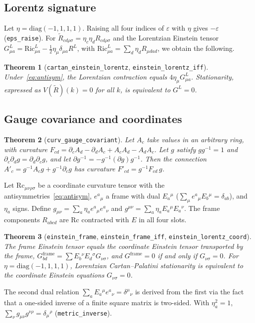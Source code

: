 \documentclass[11pt]{amsart}
\newtheorem{theorem}{Theorem}[section]
\theoremstyle{definition}
\theoremstyle{remark}
\newcommand{\lean}[1]{\texttt{#1}}
\begin{document}
\subsection{Lorentz signature}
Let $\eta=\mathrm{diag}(-1,1,1,1)$. Raising all four indices of $\varepsilon$ with $\eta$ gives $-\varepsilon$ (\lean{eps\_raise}). For $\tilde R_{cd\rho\sigma}=\eta_c\eta_dR_{cd\rho\sigma}$ and the Lorentzian Einstein tensor $G^{L}_{\mu a}=\mathrm{Ric}^L_{\mu a}-\frac12\eta_\mu\delta_{\mu a}R^L$, with $\mathrm{Ric}^L_{\mu a}=\sum_d\eta_dR_{\mu dad}$, we obtain the following.
\begin{theorem}[\lean{cartan\_einstein\_lorentz}, \lean{einstein\_lorentz\_iff}]
Under~\eqref{eq:antisym}, the Lorentzian contraction equals $4\eta_\mu G^L_{\mu a}$. Stationarity, expressed as $V(\tilde R)(k)=0$ for all $k$, is equivalent to $G^L=0$.
\end{theorem}

\subsection{Gauge covariance and coordinates}
\begin{theorem}[\lean{curv\_gauge\_covariant}]
Let $A_c$ take values in an arbitrary ring, with curvature $F_{cd}=\partial_cA_d-\partial_dA_c+A_cA_d-A_dA_c$. Let $g$ satisfy $gg^{-1}=1$ and $\partial_c\partial_dg=\partial_d\partial_cg$, and let $\partial g^{-1}=-g^{-1}(\partial g)g^{-1}$. Then the connection $A'_c=g^{-1}A_cg+g^{-1}\partial_cg$ has curvature $F'_{cd}=g^{-1}F_{cd}\,g$.
\end{theorem}

Let $\mathrm{Rc}_{\mu\nu\rho\sigma}$ be a coordinate curvature tensor with the antisymmetries~\eqref{eq:antisym}, $e^a{}_\mu$ a frame with dual $E_a{}^\mu$ ($\sum_\mu e^a{}_\mu E_b{}^\mu=\delta_{ab}$), and $\eta_a$ signs. Define $g_{\mu\nu}=\sum_a\eta_ae^a{}_\mu e^a{}_\nu$ and $g^{\mu\nu}=\sum_a\eta_aE_a{}^\mu E_a{}^\nu$. The frame components $R_{abcd}$ are $\mathrm{Rc}$ contracted with $E$ in all four slots.
\begin{theorem}[\lean{einstein\_frame}, \lean{einstein\_frame\_iff}, \lean{einstein\_lorentz\_coord}]
The frame Einstein tensor equals the coordinate Einstein tensor transported by the frame, $G^{\mathrm{frame}}_{bd}=\sum E_b{}^\nu E_d{}^\sigma G_{\nu\sigma}$, and $G^{\mathrm{frame}}=0$ if and only if $G_{\nu\sigma}=0$. For $\eta=\mathrm{diag}(-1,1,1,1)$, Lorentzian Cartan--Palatini stationarity is equivalent to the coordinate Einstein equations $G_{\nu\sigma}=0$.
\end{theorem}
The second dual relation $\sum_aE_a{}^\mu e^a{}_\nu=\delta^\mu{}_\nu$ is derived from the first via the fact that a one-sided inverse of a finite square matrix is two-sided. With $\eta_a^2=1$, $\sum_\nu g_{\mu\nu}g^{\nu\rho}=\delta_\mu{}^\rho$ (\lean{metric\_inverse}).
\end{document}
